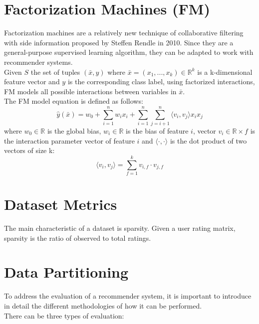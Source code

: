 \section{Factorization Machines (FM)}
\label{factorization-machines}

Factorization machines \cite{10.1109/ICDM.2010.127} are a relatively new technique of collaborative filtering with side information proposed by Steffen Rendle in 2010. Since they are a general-purpose supervised learning algorithm, they can be adapted to work with recommender systems.\\
Given $S$ the set of tuples $(\bar{x}, y)$ where $\bar{x} = (x_1, ..., x_k) \in \mathbb{R}^k$ is a k-dimensional feature vector and $y$ is the corresponding class label, using factorized interactions, FM models all possible interactions between variables in $\bar{x}$.\\
The FM model equation is defined as follows:
\begin{equation*}
\hat{y}(\bar{x}) = w_0 + \sum_{i = 1}^{n} w_i x_i + \sum_{i = 1}^{n} \sum_{j = i + 1}^{n} \langle v_i, v_j \rangle x_i x_j
\end{equation*}
where $w_0 \in \mathbb{R}$ is the global bias, $w_i \in \mathbb{R}$ is the bias of feature $i$, vector $v_i \in \mathbb{R} \times f$ is the interaction parameter vector of feature $i$ and $\langle \cdot, \cdot \rangle$ is the dot product of two vectors of size k:
\begin{equation*}
\langle v_i, v_j \rangle = \sum_{f = 1}^{k} v_{i,f} \cdot v_{j,f}
\end{equation*}



\section{Dataset Metrics}

The main characteristic of a dataset is sparsity. Given a user rating matrix, sparsity is the ratio of observed to total ratings. %



\section{Data Partitioning}

To address the evaluation of a recommender system, it is important to introduce in detail the different methodologies of how it can be performed.\\
There can be three types of evaluation:

